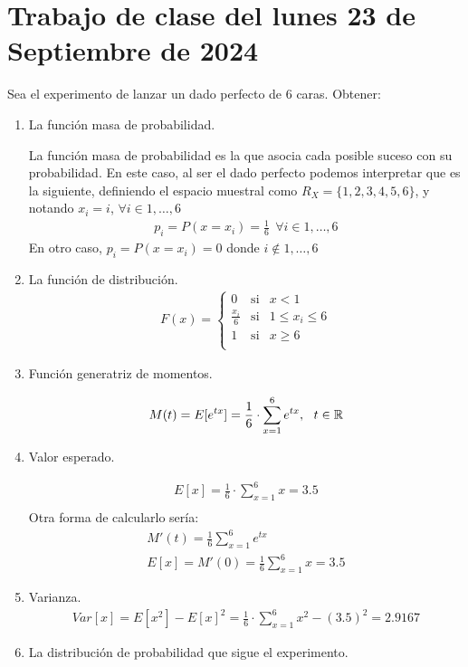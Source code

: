 \section{Trabajo de clase del lunes 23 de Septiembre de 2024}

\begin{ejercicio} Sea el experimento de lanzar un dado perfecto de 6 caras. Obtener:
    \begin{enumerate}[label=\alph*)]
        \item La función masa de probabilidad.
        
        La función masa de probabilidad es la que asocia cada posible suceso con su probabilidad. En este caso, al ser el dado perfecto podemos interpretar que es la siguiente, definiendo el espacio muestral como $R_X=\{1,2,3,4,5,6\}$, y notando $x_i=i$, $\forall i \in 1,\dots, 6$
        \begin{gather*}
            p_i=P(x=x_i) = \frac{1}{6}\ \ \forall i\in 1,\dots,6
        \end{gather*}
        En otro caso, $p_i=P(x=x_i)=0$ donde $i\notin 1,\dots,6$
        \item La función de distribución.
        \begin{gather*}
            F(x)=\left\{
            \begin{array}{ccc}
                0 & \text{si} & x<1 \\
                \frac{x_i}{6} & \text{si} & 1 \leq x_i \leq 6\\
                1 &  \text{si} & x \geq 6\\
            \end{array}
            \right.
        \end{gather*}
        \item Función generatriz de momentos.

        \begin{gather*}
            M(t)=E[e^{tx}]=\frac{1}{6} \cdot \sum\limits_{x=1}^6e^{tx},\ \ t \in \bb{R}
        \end{gather*}

        \item Valor esperado.
        
        \begin{gather*}
            E[x] = \frac{1}{6} \cdot \sum\limits_{x=1}^6 x = 3.5\\
        \end{gather*}
        Otra forma de calcularlo sería:
        \begin{gather*}
            M'(t)= \frac{1}{6} \sum\limits_{x= 1}^6 e^{tx}\\
            E[x] = M'(0) =\frac{1}{6} \sum\limits_{x=1}^6 x = 3.5
        \end{gather*}
        \item Varianza.
         \begin{gather*}
            Var[x]=E[x^2]-E[x]^2 = \frac{1}{6} \cdot \sum\limits_{x=1}^6 x^2 - (3.5)^2 = 2.9167
         \end{gather*}
        \item La distribución de probabilidad que sigue el experimento.
        

\end{enumerate}
\end{ejercicio}
